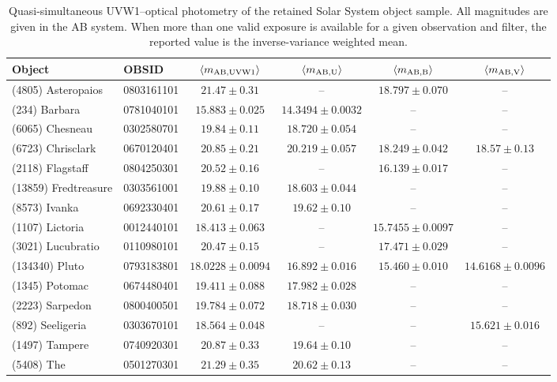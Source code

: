 \begin{table}[t]
\centering
\small
\setlength{\tabcolsep}{4pt}
\renewcommand{\arraystretch}{1.03}
\begin{tabular}{llcccc}
\toprule
Object & OBSID & $\langle m_{\rm AB,UVW1}\rangle$ & $\langle m_{\rm AB,U}\rangle$ & $\langle m_{\rm AB,B}\rangle$ & $\langle m_{\rm AB,V}\rangle$ \\
\midrule
(4805) Asteropaios & 0803161101 & $21.47 \pm 0.31$ & -- & $18.797 \pm 0.070$ & -- \\
(234) Barbara & 0781040101 & $15.883 \pm 0.025$ & $14.3494 \pm 0.0032$ & -- & -- \\
(6065) Chesneau & 0302580701 & $19.84 \pm 0.11$ & $18.720 \pm 0.054$ & -- & -- \\
(6723) Chrisclark & 0670120401 & $20.85 \pm 0.21$ & $20.219 \pm 0.057$ & $18.249 \pm 0.042$ & $18.57 \pm 0.13$ \\
(2118) Flagstaff & 0804250301 & $20.52 \pm 0.16$ & -- & $16.139 \pm 0.017$ & -- \\
(13859) Fredtreasure & 0303561001 & $19.88 \pm 0.10$ & $18.603 \pm 0.044$ & -- & -- \\
(8573) Ivanka & 0692330401 & $20.61 \pm 0.17$ & $19.62 \pm 0.10$ & -- & -- \\
(1107) Lictoria & 0012440101 & $18.413 \pm 0.063$ & -- & $15.7455 \pm 0.0097$ & -- \\
(3021) Lucubratio & 0110980101 & $20.47 \pm 0.15$ & -- & $17.471 \pm 0.029$ & -- \\
(134340) Pluto & 0793183801 & $18.0228 \pm 0.0094$ & $16.892 \pm 0.016$ & $15.460 \pm 0.010$ & $14.6168 \pm 0.0096$ \\
(1345) Potomac & 0674480401 & $19.411 \pm 0.088$ & $17.982 \pm 0.028$ & -- & -- \\
(2223) Sarpedon & 0800400501 & $19.784 \pm 0.072$ & $18.718 \pm 0.030$ & -- & -- \\
(892) Seeligeria & 0303670101 & $18.564 \pm 0.048$ & -- & -- & $15.621 \pm 0.016$ \\
(1497) Tampere & 0740920301 & $20.87 \pm 0.33$ & $19.64 \pm 0.10$ & -- & -- \\
(5408) The & 0501270301 & $21.29 \pm 0.35$ & $20.62 \pm 0.13$ & -- & -- \\
\bottomrule
\end{tabular}
\caption{Quasi-simultaneous UVW1--optical photometry of the retained Solar System object sample. All magnitudes are given in the AB system. When more than one valid exposure is available for a given observation and filter, the reported value is the inverse-variance weighted mean.}
\label{tab:quasi-simultaneous-multiband}
\end{table}
